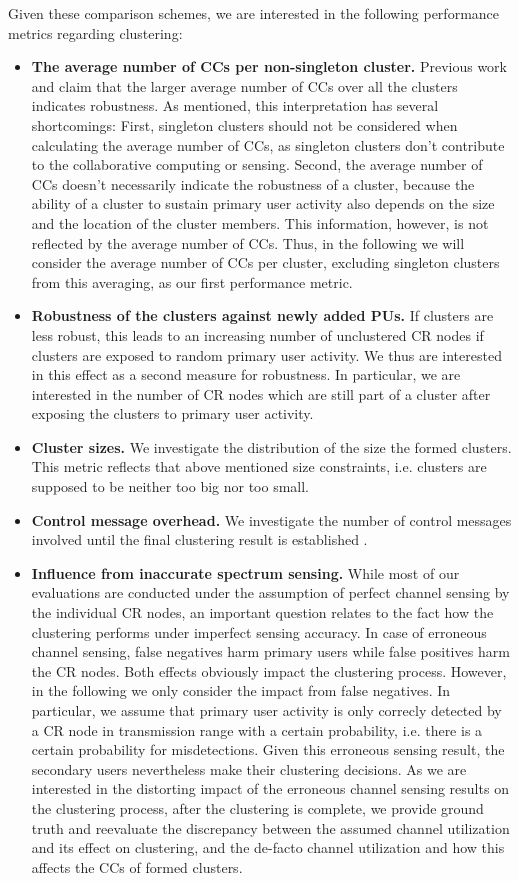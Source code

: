 \documentclass[times]{ettauth}
\theoremstyle{mytheoremstyle}
\theoremstyle{mytheoremstyle}
\theoremstyle{mytheoremstyle}
\begin{document}
Given these comparison schemes, we are interested in the following performance metrics regarding clustering:
\begin{itemize}
\item \textbf{The average number of CCs per non-singleton cluster.}
Previous work \cite{LIU_TMC11_2} and \cite{Li11_ROSS} claim that the larger average number of CCs over all the clusters indicates robustness. As mentioned, this interpretation has several shortcomings:
First, singleton clusters should not be considered when calculating the average number of CCs, as singleton clusters don't contribute to the collaborative computing or sensing.
Second, the average number of CCs doesn't necessarily indicate the robustness of a cluster, because the ability of a cluster to sustain primary user activity also depends on the size and the location of the cluster members. This information, however, is not reflected by the average number of CCs.
Thus, in the following we will consider the average number of CCs per cluster, excluding singleton clusters from this averaging, as our first performance metric.
\item \textbf{Robustness of the clusters against newly added PUs.}
If clusters are less robust, this leads to an increasing number of unclustered CR nodes if clusters are exposed to random primary user activity.
We thus are interested in this effect as a second measure for robustness. 
In particular, we are interested in the number of CR nodes which are still part of a cluster after exposing the clusters to primary user activity.
\item \textbf{Cluster sizes.}
We investigate the distribution of the size the formed clusters.
This metric reflects that above mentioned size constraints, i.e. clusters are supposed to be neither too big nor too small.
\item \textbf{Control message overhead.}
We investigate the number of control messages involved until the final clustering result is established .
\item \textbf{Influence from inaccurate spectrum sensing.}
While most of our evaluations are conducted under the assumption of perfect channel sensing by the individual CR nodes, an important question relates to the fact how the clustering performs under imperfect sensing accuracy.
In case of erroneous channel sensing, false negatives harm primary users while false positives harm the CR nodes.
Both effects obviously impact the clustering process. 
However, in the following we only consider the impact from false negatives. 
In particular, we assume that primary user activity is only correcly detected by a CR node in transmission range with a certain probability, i.e. there is a certain probability for misdetections.
Given this erroneous sensing result, the secondary users nevertheless make their clustering decisions.
As we are interested in the distorting impact of the erroneous channel sensing results on the clustering process, after the clustering is complete, we provide ground truth and reevaluate the discrepancy between the assumed channel utilization and its effect on clustering, and the de-facto channel utilization and how this affects the CCs of formed clusters.
\end{itemize}
\end{document}
